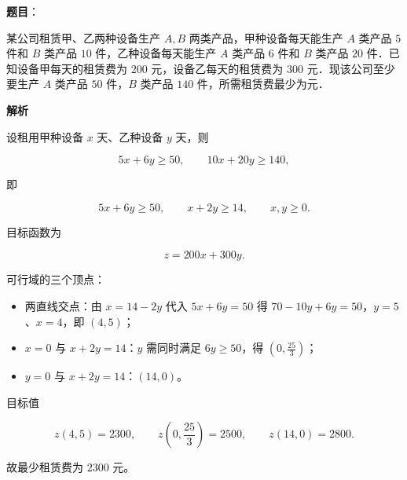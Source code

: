\begin{answer}

\textbf{题目}：

某公司租赁甲、乙两种设备生产 $A,B$ 两类产品，甲种设备每天能生产 $A$ 类产品 $5$ 件和 $B$ 类产品 $10$ 件，乙种设备每天能生产 $A$ 类产品 $6$ 件和 $B$ 类产品 $20$ 件．已知设备甲每天的租赁费为 $200$ 元，设备乙每天的租赁费为 $300$ 元．现该公司至少要生产 $A$ 类产品 $50$ 件，$B$ 类产品 $140$ 件，所需租赁费最少为\gkblank{}元．

\textbf{解析}

设租用甲种设备 $x$ 天、乙种设备 $y$ 天，则

\nopagebreak[4]
\[5x+6y\geqslant50,\qquad 10x+20y\geqslant140,\]

即

\nopagebreak[4]
\[5x+6y\geqslant50,\qquad x+2y\geqslant14,\qquad x,y\geqslant0 .\]

目标函数为

\nopagebreak[4]
\[z=200x+300y .\]

可行域的三个顶点：

\begin{itemize}
\item 两直线交点：由 $x=14-2y$ 代入 $5x+6y=50$ 得 $70-10y+6y=50$，$y=5$、$x=4$，即 $(4,5)$；
\item $x=0$ 与 $x+2y=14$：$y$ 需同时满足 $6y\geqslant50$，得 $\left(0,\frac{25}{3}\right)$；
\item $y=0$ 与 $x+2y=14$：$(14,0)$。
\end{itemize}

目标值

\nopagebreak[4]
\[z(4,5)=2300,\qquad z\left(0,\frac{25}{3}\right)=2500,\qquad z(14,0)=2800 .\]

故最少租赁费为 $2300$ 元。


\end{answer}
